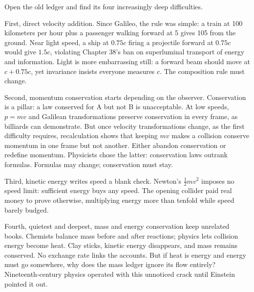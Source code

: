\begin{mainline}
Open the old ledger and find its four increasingly deep difficulties.

First, direct velocity addition. Since Galileo, the rule was simple: a train at 100 kilometers per hour plus a passenger walking forward at 5 gives 105 from the ground. Near light speed, a ship at \(0.75c\) firing a projectile forward at \(0.75c\) would give \(1.5c\), violating Chapter 38's ban on superluminal transport of energy and information. Light is more embarrassing still: a forward beam should move at \(c+0.75c\), yet invariance insists everyone measures \(c\). The composition rule must change.

Second, momentum conservation starts depending on the observer. Conservation is a pillar: a law conserved for A but not B is unacceptable. At low speeds, \(p=mv\) and Galilean transformations preserve conservation in every frame, as billiards can demonstrate. But once velocity transformations change, as the first difficulty requires, recalculation shows that keeping \(mv\) makes a collision conserve momentum in one frame but not another. Either abandon conservation or redefine momentum. Physicists chose the latter: conservation laws outrank formulas. Formulas may change; conservation must stay.

Third, kinetic energy writes speed a blank check. Newton's \(\tfrac12 mv^{2}\) imposes no speed limit: sufficient energy buys any speed. The opening collider paid real money to prove otherwise, multiplying energy more than tenfold while speed barely budged.

Fourth, quietest and deepest, mass and energy conservation keep unrelated books. Chemists balance mass before and after reactions; physics lets collision energy become heat. Clay sticks, kinetic energy disappears, and mass remains conserved. No exchange rate links the accounts. But if heat is energy and energy must go somewhere, why does the mass ledger ignore its flow entirely? Nineteenth-century physics operated with this unnoticed crack until Einstein pointed it out.
\end{mainline}


